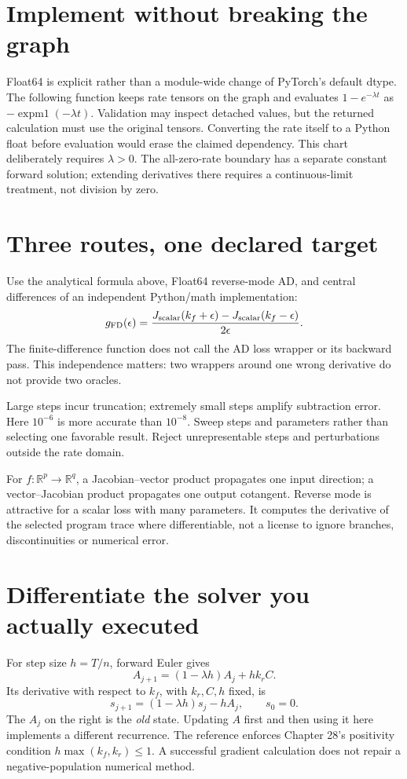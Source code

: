 \section{Implement without breaking the graph}
Float64 is explicit rather than a module-wide change of PyTorch's default dtype.
The following function keeps rate tensors on the graph and evaluates
$1-e^{-\lambda t}$ as $-\operatorname{expm1}(-\lambda t)$.
Validation may inspect detached values, but the returned calculation must use the
original tensors. Converting the rate itself to a Python float before evaluation
would erase the claimed dependency. This chart deliberately requires $\lambda>0$.
The all-zero-rate boundary has a separate constant forward solution; extending
derivatives there requires a continuous-limit treatment, not division by zero.

\section{Three routes, one declared target}
Use the analytical formula above, Float64 reverse-mode AD, and central differences
of an independent Python/math implementation:
\[
 g_{\rm FD}(\epsilon)=
 \frac{J_{\rm scalar}(k_f+\epsilon)-J_{\rm scalar}(k_f-\epsilon)}{2\epsilon}.
\]
The finite-difference function does not call the AD loss wrapper or its backward
pass. This independence matters: two wrappers around one wrong derivative do not
provide two oracles.
\begin{center}\end{center}
Large steps incur truncation; extremely small steps amplify subtraction error.
Here $10^{-6}$ is more accurate than $10^{-8}$. Sweep steps and parameters rather
than selecting one favorable result. Reject unrepresentable steps and perturbations
outside the rate domain.

For $f:\mathbb R^p\to\mathbb R^q$, a Jacobian--vector product propagates one input
direction; a vector--Jacobian product propagates one output cotangent. Reverse mode
is attractive for a scalar loss with many parameters. It computes the derivative
of the selected program trace where differentiable, not a license to ignore branches,
discontinuities or numerical error.

\section{Differentiate the solver you actually executed}
For step size $h=T/n$, forward Euler gives
\[
 A_{j+1}=(1-\lambda h)A_j+h k_r C.
\]
Its derivative with respect to $k_f$, with $k_r,C,h$ fixed, is
\[
 s_{j+1}=(1-\lambda h)s_j-h A_j,\qquad s_0=0.
\]
The $A_j$ on the right is the \emph{old} state. Updating $A$ first and then using
it here implements a different recurrence.
The reference enforces Chapter 28's positivity condition
$h\max(k_f,k_r)\leq1$. A successful gradient calculation does not repair
a negative-population numerical method.

